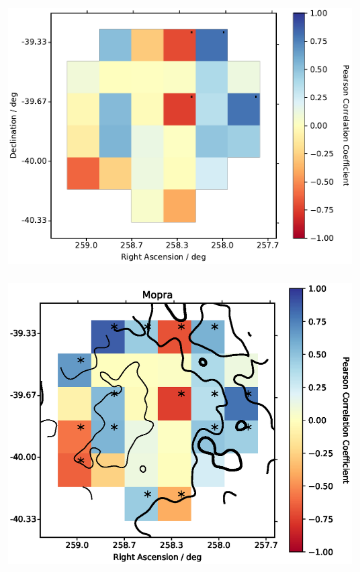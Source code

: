 \documentclass[12pt,a4paper]{article}
\begin{document}
\begin{figure}[h]
	\begin{subfigure}{0.5\textwidth}
		\centering
		\includegraphics[width=1.00\linewidth, height=0.25\textheight]{pearsonmap_gam_mopHI}
		\label{fig:corsigmap}
	\end{subfigure}
	\begin{subfigure}{0.5\textwidth}
		\centering
		\includegraphics[width=1.00\linewidth, height=0.25\textheight]{pearsonmap_gam_mopHI_trimmed}
		\label{fig:wpratiomap}
	\end{subfigure}
	\begin{subfigure}{0.5\textwidth}
		\centering

\end{subfigure}
\end{figure}
\end{document}
